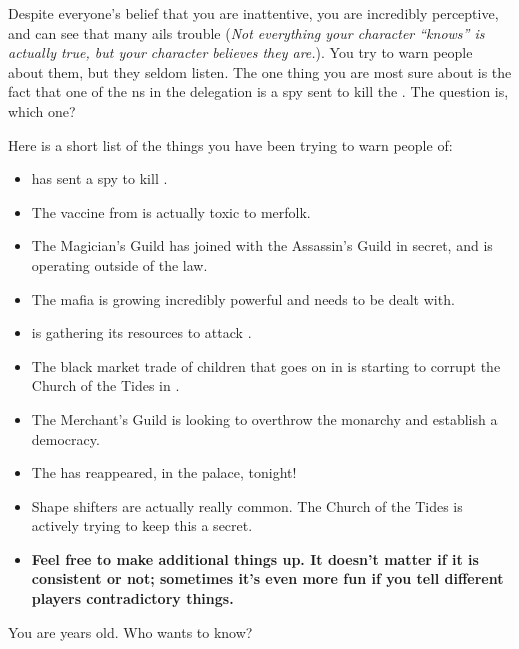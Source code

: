 \documentclass[char]{NeptuneBall}
\begin{document}
Despite everyone's belief that you are inattentive, you are incredibly perceptive, and can see that many ails trouble \pAtlantis{} (\emph{Not everything your character ``knows'' is actually true, but your character believes they are.}). You try to warn people about them, but they seldom listen. The one thing you are most sure about is the fact that one of the \pPacifica{}ns in the delegation is a spy sent to kill the \cKing{}. The question is, which one?

Here is a short list of the things you have been trying to warn people of:
\begin{itemize}
 \item \pPacifica{} has sent a spy to kill \cKing{}.
 \item The \ppolio{} vaccine from \pAmerica{} is actually toxic to merfolk.
 \item The Magician's Guild has joined with the Assassin's Guild in secret, and is operating outside of the law.
 \item The mafia is growing incredibly powerful and needs to be dealt with.
 \item \pIndia{} is gathering its resources to attack \pAtlantis{}.
 \item The black market trade of children that goes on in \pPacifica{} is starting to corrupt the Church of the Tides in \pAtlantis{}.
 \item The Merchant's Guild is looking to overthrow the monarchy and establish a democracy.
 \item The \iWishingStone{\MYname} has reappeared, in the palace, tonight!
 \item Shape shifters are actually really common. The Church of the Tides is actively trying to keep this a secret.
 \item {\bf Feel free to make additional things up. It doesn't matter if it is consistent or not; sometimes it's even more fun if you tell different players contradictory things.}
\end{itemize}

\begin{itemz}[Trivia]
  \item You are \cOsiris{\MYnumber} years old. Who wants to know?
\end{itemz}
\end{document}
